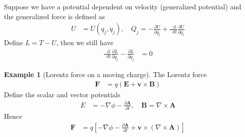 \documentclass[twoside,9pt]{article}
\numberwithin{equation}{section} %
\newcommand{\lms}{\fontfamily{lmss}\selectfont} %
\renewcommand*\d{\mathop{}\!\mathrm{d}}
\theoremstyle{definition}
\newtheorem{example}{\lms Example}[section]
\theoremstyle{remark}
\begin{document}
Suppose we have a potential dependent on velocity (generalized potential)
and the generalized force is defined as
\begin{align}
    U &= U(q_j,\dot{q}_j), \quad
    Q_j = -\frac{\partial U}{\partial q_j} 
    + \frac{\d }{\d t}\frac{\partial U}{\partial\dot{q}_j}
\end{align}
Define $L = T-U$, then we still have
\begin{align}
    \frac{\d }{\d t}\frac{\partial L}{\partial \dot{q}_j} - \frac{\partial L}{\partial q_j} &= 0
\end{align}
\begin{example}[Lorentz force on a moving charge]
The Lorentz force
\begin{align*}
    \mathbf{F} &= 
    q(\mathbf{E} + \mathbf{v}\times\mathbf{B})
\end{align*}
Define the scalar and vector potentials
\begin{align*}
    E &= -\nabla\phi - \frac{\partial \mathbf{A}}{\partial t},\quad
    \mathbf{B} = \nabla\times\mathbf{A}
\end{align*}
Hence
\begin{align*}
    \mathbf{F} &= 
    q\left[
        -\nabla\phi - \frac{\partial \mathbf{A}}{\partial t}
        + \mathbf{v}\times(\nabla\times\mathbf{A})
    \right]
\end{align*}

\end{example}
\end{document}
